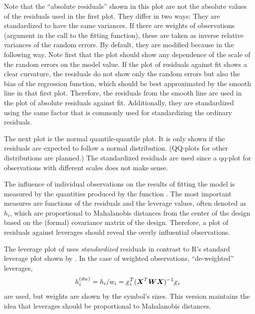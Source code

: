 \documentclass[11pt]{article}\usepackage[]{graphicx}\usepackage[]{color}
\begin{document}
Note that the ``absolute residuals'' shown in this plot are not the 
absolute values of the residuals used in the first plot. 
They differ in two ways:
\Itm
They are standardized to have the same variances.
If there are weights of observations (argument  in the call to
the fitting function), these are taken as inverse relative variances of
the random errors.
\Itm
By default, they are modified because in the following way.
Note first that the plot should show any dependence of the scale of the
random errors on the model value.
If the plot of residuals against fit shows a clear curvature, the
residuals do not show only the random errors but also the bias of the
regression function, which should be best approximated by the smooth line
in that first plot. Therefore, the residuals from the smooth line are 
used in the plot of absolute residuals against fit.
Additionally, they are standardized using the same factor that is commonly
used for standardizing the ordinary residuals.



The next plot is the normal quantile-quantile plot. It is only shown if the
residuals are expected to follow a normal distribution.
(QQ-plots for other distributions are planned.)
The standardized residuals are used since a qq-plot for observations with 
different scales does not make sense.

The influence of individual observations on the results of fitting the model
is measured by the quantities produced by the function .
The most important measures are functions of the residuals and the 
leverage values, often denoted as $h_i$, which are proportional to
Mahalanobis distances from the center of the design based on the 
(formal) covariance matrix of the design.
Therefore, a plot of residuals against leverages should reveal the overly
influential observations.

The leverage plot of  uses \emph{standardized} residuals
in contrast to R's standard leverage plot shown by .
In the case of weighted observations, ``de-weighted'' leverages,
\[
  h_i\sups{dw} = h_i/w_i = \vc x_i\tr (\mx X\tr \mx W \mx X)\inv \vc x_i
\]
are used, but weights are shown by the symbol's sizes.
This version maintains the idea that leverages should be proportional to 
Mahalanobis distances.
\end{document}
